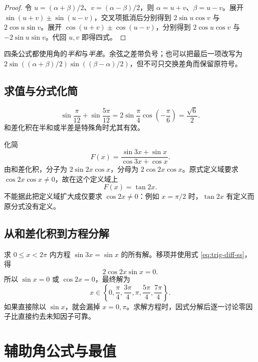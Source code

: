\documentclass[UTF8,12pt,a4paper,fontset=fandol]{ctexart}
\begin{document}
\begin{proof}
令 $u=(\alpha+\beta)/2$、$v=(\alpha-\beta)/2$，则 $\alpha=u+v$、$\beta=u-v$。展开 $\sin(u+v)\pm\sin(u-v)$，交叉项抵消后分别得到 $2\sin u\cos v$ 与 $2\cos u\sin v$。展开 $\cos(u+v)\pm\cos(u-v)$，分别得到 $2\cos u\cos v$ 与 $-2\sin u\sin v$。代回 $u,v$ 即得四式。
\end{proof}

四条公式都使用角的\emph{半和}与\emph{半差}。余弦之差带负号；也可以把最后一项改写为 $2\sin((\alpha+\beta)/2)\sin((\beta-\alpha)/2)$，但不可只交换差角而保留原符号。

\subsection{求值与分式化简}

\begin{example}[和式求值]
\[
  \sin\frac\pi{12}+\sin\frac{5\pi}{12}
  =2\sin\frac\pi4\cos\left(-\frac\pi6\right)
  =\frac{\sqrt6}{2}.
\]
和差化积在半和或半差是特殊角时尤其有效。
\end{example}

\begin{example}[约分前保留定义域]
化简
\[
  F(x)=\frac{\sin3x+\sin x}{\cos3x+\cos x}.
\]
由和差化积，分子为 $2\sin2x\cos x$，分母为 $2\cos2x\cos x$。原式定义域要求 $\cos2x\cos x\ne0$，故在这个定义域上
\[
  F(x)=\tan2x.
\]
不能据此把定义域扩大成仅要求 $\cos2x\ne0$：例如 $x=\pi/2$ 时，$\tan2x$ 有定义而原分式没有定义。
\end{example}

\subsection{从和差化积到方程分解}

\begin{example}[完整保留各个因子产生的解]
求 $0\le x<2\pi$ 内方程 $\sin3x=\sin x$ 的所有解。移项并使用式 \eqref{eq:trig-diff-ss}，得
\[
  2\cos2x\sin x=0.
\]
所以 $\sin x=0$ 或 $\cos2x=0$，最终解为
\[
  x\in\left\{0,\frac\pi4,\frac{3\pi}4,\pi,
                    \frac{5\pi}4,\frac{7\pi}4\right\}.
\]
如果直接除以 $\sin x$，就会漏掉 $x=0,\pi$。求解方程时，因式分解后逐一讨论零因子比直接约去未知因子可靠。
\end{example}

\section{辅助角公式与最值}
\label{sec:trig-auxiliary}
\end{document}
